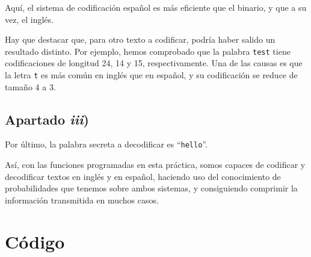 \documentclass[a4paper]{article}
\begin{document}
	Aquí, el sistema de codificación español es más eficiente que el binario, y que a su vez, el inglés. 
	
	Hay que destacar que, para otro texto a codificar, podría haber salido un resultado distinto. Por ejemplo, hemos comprobado que la palabra \verb|test| tiene codificaciones de longitud 24, 14 y 15, respectivamente. Una de las causas es que la letra \verb|t| es más común en inglés que en español, y su codificación se reduce de tamaño 4 a 3.
	
	
	\subsection{Apartado \textit{iii})}
	
	Por último, la palabra secreta a decodificar es ``\verb|hello|''.
	
	Así, con las funciones programadas en esta práctica, somos capaces de codificar y decodificar textos en inglés y en español, haciendo uso del conocimiento de probabilidades que tenemos sobre ambos sistemas, y consiguiendo comprimir la información transmitida en muchos casos.
	
	\newpage
	\section{Código}\label{codigo}
	
	
	
\end{document}
